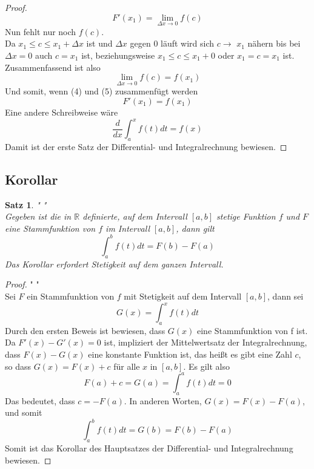 \documentclass[fontsize=12pt,paper=a4,DIV12,cleardoublepage=empty, 
liststotoc,idxtotoc,bibtotoc]{article}
\newcommand{\RR}{\mathbb{R}}
\theoremstyle{plain}
\newtheorem{satz}{Satz}[subsection]
\theoremstyle{definition}
\begin{document}
\begin{proof}
\begin{equation}
			F'(x_1)=\lim \limits_{\Delta x \to 0}f(c)
		\end{equation}
		Nun fehlt nur noch $f(c)$.\\ Da $x_1 \leq c \leq x_1+\Delta x$ ist und $\Delta x$ gegen $0$ läuft wird sich $c\to$ $x_1$ nähern bis bei $\Delta x=0$ auch $c = x_1$ ist, beziehungsweise $x_1 \leq c \leq x_1 + 0$ oder $x_1 = c = x_1$ ist.\\Zusammenfassend ist also
		\begin{equation}
			\lim \limits_{\Delta x \to 0} f(c) = f(x_1)
		\end{equation}
		Und somit, wenn (4) und (5) zusammenfügt werden
		\begin{equation*}
			F'(x_1)=f(x_1)
		\end{equation*}
		Eine andere Schreibweise wäre
		\begin{equation*}
			\frac{d}{dx}\int_{a}^{x}f(t)dt=f(x)
		\end{equation*}
		Damit ist der erste Satz der Differential- und Integralrechnung bewiesen.
	\end{proof}
	\newpage
	
	
	\subsection{Korollar}
	\begin{satz}" "\\
		Gegeben ist die in $\RR$ definierte, auf dem Intervall $[a, b]$ stetige Funktion $f$  und $F$ eine Stammfunktion von $f$ im Intervall $[a, b]$, dann gilt
		\begin{equation*}
			\int_{a}^{b}f(t)dt=F(b)-F(a)
		\end{equation*}
		Das Korollar erfordert Stetigkeit auf dem ganzen Intervall.
	\end{satz}

	\begin{proof}" "\\
		Sei $F$ ein Stammfunktion von $f$ mit Stetigkeit auf dem Intervall $[a, b]$, dann sei
		\begin{equation*}
			G(x)=\int_{a}^{x}f(t)dt
		\end{equation*}
		Durch den ersten Beweis ist bewiesen, dass $G(x)$ eine Stammfunktion von f ist. Da $F'(x)-G'(x)=0$ ist, impliziert der Mittelwertsatz der Integralrechnung, dass $F(x)-G(x)$ eine konstante Funktion ist, das heißt es gibt eine Zahl $c$, so dass $G(x)=F(x)+c$ für alle $x$ in $[a, b]$. Es gilt also
		\begin{equation*}
			F(a)+c=G(a)=\int_{a}^{a}f(t)dt=0
		\end{equation*}
		Das bedeutet, dass $c=-F(a)$. In anderen Worten, $G(x)=F(x)-F(a)$, und somit
		\begin{equation*}
			\int_{a}^{b}f(t)dt=G(b)=F(b)-F(a)
		\end{equation*}
		Somit ist das Korollar des Hauptsatzes der Differential- und Integralrechnung bewiesen.
	\end{proof}	
	\newpage
	
\end{document}
